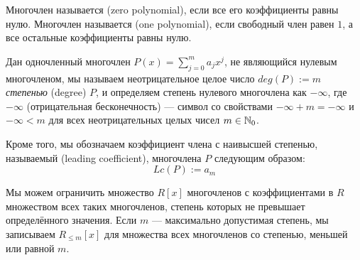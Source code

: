 Многочлен называется  (zero polynomial), если все его коэффициенты равны нулю. Многочлен называется  (one polynomial), если свободный член равен $1$, а все остальные коэффициенты равны нулю.

Дан одночленный многочлен $P(x)=\sum_{j=0}^m a_jx^j$, не являющийся нулевым многочленом, мы называем неотрицательное целое число $deg(P):=m$ \textit{степенью} (degree) $P$, и определяем степень нулевого многочлена как $-\infty$, где $-\infty$ (отрицательная бесконечность) — символ со свойствами $-\infty + m = -\infty$ и $-\infty < m$ для всех неотрицательных целых чисел $m\in\mathbb{N}_0$. 

Кроме того, мы обозначаем коэффициент члена с наивысшей степенью, называемый  (leading coefficient), многочлена $P$ следующим образом:
\begin{equation}
\label{def_leading_coefficient}
Lc(P):=a_m
\end{equation}

Мы можем ограничить множество $R[x]$  многочленов с коэффициентами в $R$ множеством всех таких многочленов, степень которых не превышает определённого значения. Если $m$ — максимально допустимая степень, мы записываем $R_{\leq m}[x]$ для множества всех многочленов со степенью, меньшей или равной $m$.

